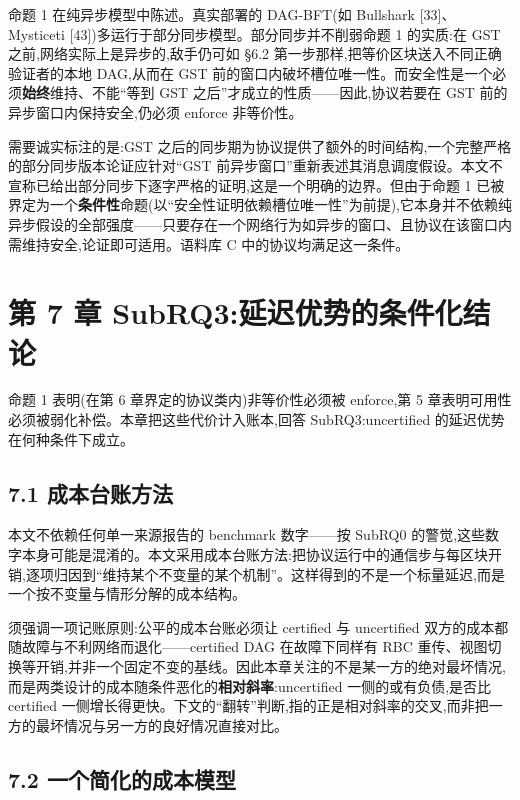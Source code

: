 \documentclass[UTF8,fontset=windows,a4paper,11pt]{ctexart}
\begin{document}
命题 1 在纯异步模型中陈述。真实部署的 DAG-BFT(如 Bullshark
{[}33{]}、Mysticeti {[}43{]})多运行于部分同步模型。部分同步并不削弱命题
1 的实质:在 GST 之前,网络实际上是异步的,敌手仍可如 §6.2
第一步那样,把等价区块送入不同正确验证者的本地 DAG,从而在 GST
前的窗口内破坏槽位唯一性。而安全性是一个必须\textbf{始终}维持、不能``等到
GST 之后''才成立的性质------因此,协议若要在 GST
前的异步窗口内保持安全,仍必须 enforce 非等价性。

需要诚实标注的是:GST
之后的同步期为协议提供了额外的时间结构,一个完整严格的部分同步版本论证应针对``GST
前异步窗口''重新表述其消息调度假设。本文不宣称已给出部分同步下逐字严格的证明,这是一个明确的边界。但由于命题
1
已被界定为一个\textbf{条件性}命题(以``安全性证明依赖槽位唯一性''为前提),它本身并不依赖纯异步假设的全部强度------只要存在一个网络行为如异步的窗口、且协议在该窗口内需维持安全,论证即可适用。语料库
C 中的协议均满足这一条件。

\section{第 7 章
SubRQ3:延迟优势的条件化结论}\label{ux7b2c-7-ux7ae0-subrq3ux5ef6ux8fdfux4f18ux52bfux7684ux6761ux4ef6ux5316ux7ed3ux8bba}

命题 1 表明(在第 6 章界定的协议类内)非等价性必须被 enforce,第 5
章表明可用性必须被弱化补偿。本章把这些代价计入账本,回答
SubRQ3:uncertified 的延迟优势在何种条件下成立。

\subsection{7.1
成本台账方法}\label{ux6210ux672cux53f0ux8d26ux65b9ux6cd5}

本文不依赖任何单一来源报告的 benchmark 数字------按 SubRQ0
的警觉,这些数字本身可能是混淆的。本文采用成本台账方法:把协议运行中的通信步与每区块开销,逐项归因到``维持某个不变量的某个机制''。这样得到的不是一个标量延迟,而是一个按不变量与情形分解的成本结构。

须强调一项记账原则:公平的成本台账必须让 certified 与 uncertified
双方的成本都随故障与不利网络而退化------certified DAG 在故障下同样有 RBC
重传、视图切换等开销,并非一个固定不变的基线。因此本章关注的不是某一方的绝对最坏情况,而是两类设计的成本随条件恶化的\textbf{相对斜率}:uncertified
一侧的或有负债,是否比 certified
一侧增长得更快。下文的``翻转''判断,指的正是相对斜率的交叉,而非把一方的最坏情况与另一方的良好情况直接对比。

\subsection{7.2
一个简化的成本模型}\label{ux4e00ux4e2aux7b80ux5316ux7684ux6210ux672cux6a21ux578b}
\end{document}
